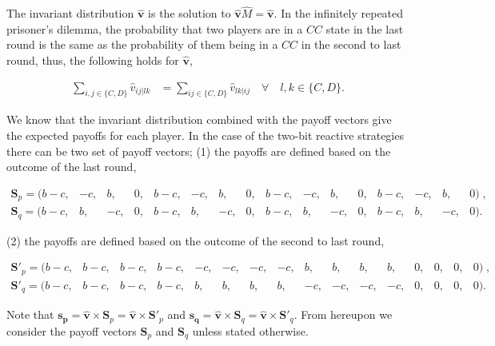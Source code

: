 \documentclass{article}
\theoremstyle{definition}
\begin{document}
The invariant distribution \(\mathbf{\hat{v}}\) is the solution to
\(\mathbf{\hat{v}} \hat{M} = \mathbf{\hat{v}}\). In the infinitely
repeated prisoner's dilemma, the probability that two players are in a \(CC\)
state in the last round is the same as the probability of them being in a \(CC\)
in the second to last round, thus, the following holds for
\(\mathbf{\hat{v}}\),

\begin{align}\label{eq:last_rounds_equality}
  \sum_{i, j \in \{C, D\}} \hat{v}_{i j | l k} & = \sum_{i j \in \{C, D\}} \hat{v}_{l k | ij} \quad \forall \quad l, k \in \{C, D\}.
\end{align}

We know that the invariant distribution combined with the payoff vectors give
the expected payoffs for each player. In the case of the two-bit reactive
strategies there can be two set of payoff vectors; (1) the payoffs are
defined based on the outcome of the last round,

\begin{equation}\label{eq:last_round_two_bits}
  \begin{array}{*{16}{c}}
    \mathbf{S}_{p} = ( b - c , & -c , & b , & 0 , & b - c , & -c , & b , & 0 , & b - c , & -c , & b , & 0 , & b - c , & -c , & b , & 0)  \;, \\
    \mathbf{S}_{q} = ( b - c, & b, & -c, & 0, & b - c, & b, & -c, & 0, & b - c, & b, & -c, & 0, & b - c, & b, & -c, & 0).
  \end{array}
\end{equation}

(2) the payoffs are defined based on the outcome of the second to last round,

\begin{equation}\label{eq:second_to_last_round_two_bits}
  \begin{array}{*{16}{c}}
    \mathbf{S}'_{p} = (b - c, & b - c, & b - c, & b - c, & -c, & -c, & -c, & -c, & b, & b, & b, & b, & 0, & 0, & 0, & 0)  \;, \\
    \mathbf{S}'_{q} = (b - c, & b - c, & b - c, & b - c, & b, & b, & b, & b, & -c, & -c, & -c, & -c, & 0, & 0, & 0, & 0).
  \end{array}
\end{equation}

Note that \(\mathbf{s_{p}} = \mathbf{\hat{v}} \times \mathbf{S}_{p} =
\mathbf{\hat{v}} \times \mathbf{S}'_{p}\) and \(\mathbf{s_{q}} =\mathbf{\hat{v}}
\times \mathbf{S}_{q} = \mathbf{\hat{v}} \times \mathbf{S}'_{q}\). From
hereupon we consider the payoff vectors \(\mathbf{S}_{p}\) and
\(\mathbf{S}_{q}\) unless stated otherwise.
\end{document}
